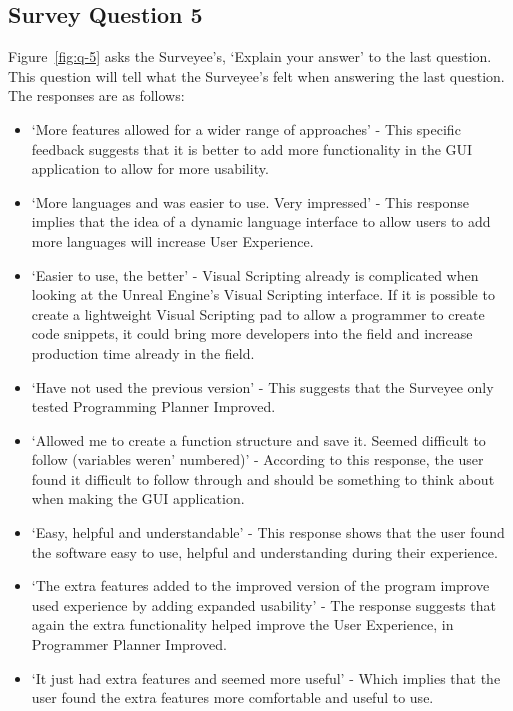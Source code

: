 \documentclass[12pt]{report} %
\begin{document}
			\subsection{Survey Question 5}
				Figure~\ref{fig:q-5} asks the Surveyee's, `Explain your answer' to the last question. This question will tell what the Surveyee's felt when answering the last question. The responses are as follows:
				\begin{itemize}
					\item `More features allowed for a wider range of approaches' - This specific feedback suggests that it is better to add more functionality in the GUI application to allow for more usability.
					\item `More languages and was easier to use. Very impressed' - This response implies that the idea of a dynamic language interface to allow users to add more languages will increase User Experience.
					\item `Easier to use, the better' - Visual Scripting already is complicated when looking at the Unreal Engine's Visual Scripting interface. If it is possible to create a lightweight Visual Scripting pad to allow a programmer to create code snippets, it could bring more developers into the field and increase production time already in the field.
					\item `Have not used the previous version' - This suggests that the Surveyee only tested Programming Planner Improved.
					\item `Allowed me to create a function structure and save it. Seemed difficult to follow (variables weren' numbered)' - According to this response, the user found it difficult to follow through and should be something to think about when making the GUI application.
					\item `Easy, helpful and understandable' - This response shows that the user found the software easy to use, helpful and understanding during their experience.
					\item `The extra features added to the improved version of the program improve used experience by adding expanded usability' - The response suggests that again the extra functionality helped improve the User Experience, in Programmer Planner Improved.
					\item `It just had extra features and seemed more useful' - Which implies that the user found the extra features more comfortable and useful to use.
				\end{itemize}
		
\end{document}
